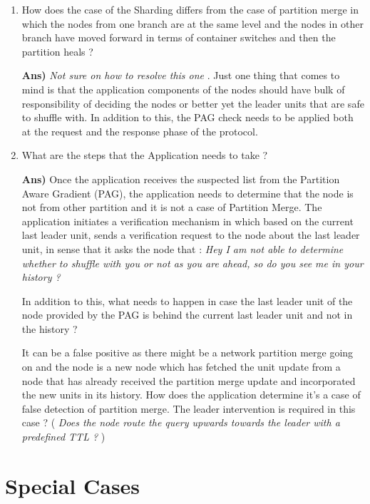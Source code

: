 \documentclass[a4paper, 11pt]{article}
\begin{document}
\begin{enumerate}
\item How does the case of the Sharding differs from the case of partition merge in which the nodes from one branch are at the same level and the nodes in other branch have moved forward in terms of container switches and then the partition heals ?

\textbf{Ans)} \textit{ Not sure on how to resolve this one }. Just one thing that comes to mind is that the application components of the nodes should have bulk of responsibility of deciding the nodes or better yet the leader units that are safe to shuffle with. In addition to this, the PAG check needs to be applied both at the request and the response phase of the protocol.

\item What are the steps that the Application needs to take ?

\textbf{Ans)} Once the application receives the suspected list from the Partition Aware Gradient (PAG), the application needs to determine that the node is not from other partition and it is not a case of Partition Merge. The application initiates a verification mechanism in which based on the current last leader unit, sends a verification request to the node about the last leader unit, in sense that it asks the node that : \textit{ Hey I am not able to determine whether to shuffle with you or not as you are ahead, so do you see me in your history ?}

In addition to this, what needs to happen in case the last leader unit of the node provided by the PAG is behind the current last leader unit and not in the history ?

It can be a false positive as there might be a network partition merge going on and the node is a new node which has fetched the unit update from a node that has already received the partition merge update and incorporated the new units in its history. How does the application determine it's a case of false detection of partition merge. The leader intervention is required in this case ? ( \textit{ Does the node route the query upwards towards the leader with a predefined TTL ? } )

\end{enumerate}



\section{Special Cases}
\end{document}

